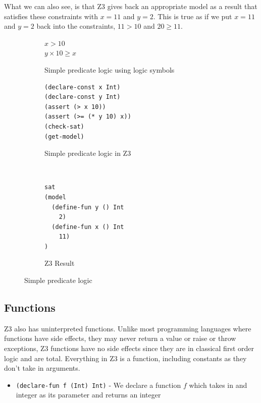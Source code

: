 \documentclass[a4paper]{report}
\begin{document}
What we can also see, is that Z3 gives back an appropriate model as a result that satisfies these constraints with $x = 11$ and $y = 2$. This is true as if we put $x = 11$ and $y = 2$ back into the constraints, $11 > 10$ and $20 \geq 11$.
\begin{figure}[!htb]
\centering
\begin{subfigure}[b]{\textwidth}
\centering
$x > 10$ \\
$y \times 10 \geq x$
\caption{Simple predicate logic using logic symbols}
\label{fig:Simple predicate logic using logic symbols}
\end{subfigure}
\begin{subfigure}[b]{\textwidth}
\lstset{numbers=left, showspaces=false,
    showstringspaces=false, tabsize=2, breaklines=true,
    xleftmargin=5.0ex,
}
\lstset{basicstyle=\ttfamily}
\centering
\begin{lstlisting}[frame=single]
(declare-const x Int)
(declare-const y Int)
(assert (> x 10))
(assert (>= (* y 10) x))
(check-sat)
(get-model)
\end{lstlisting}
\caption{Simple predicate logic in Z3}
\label{fig:Simple predicate logic in Z3}
\end{subfigure}\\
\begin{subfigure}[b]{\textwidth}
\lstset{basicstyle=\ttfamily}
\begin{lstlisting}[frame=single]
sat
(model 
  (define-fun y () Int
    2)
  (define-fun x () Int
    11)
)
\end{lstlisting}
\caption{Z3 Result}
\label{fig:Z3 Result}
\end{subfigure}
\caption{Simple predicate logic}
\label{fig:Simple predicate logic}
\end{figure}

\subsection{Functions}
Z3 also has uninterpreted functions. Unlike most programming languages where functions have side effects, they may never return a value or raise or throw exceptions, Z3 functions have no side effects since they are in classical first order logic and are total.
Everything in Z3 is a function, including constants as they don’t take in arguments.
\begin{itemize}
\item \texttt{(declare-fun f (Int) Int)} - We declare a function $f$ which takes in and integer as its parameter and returns an integer
\end{itemize}
\end{document}
